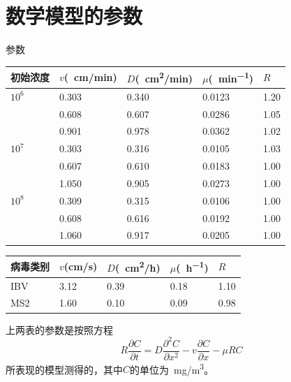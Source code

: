 \documentclass[xcolor=dvipsnames]{beamer}
\begin{document}
\section{数学模型的参数}
	\begin{frame}{参数}
	\centering
	\begin{tabularx}{12cm}{XXXXX}
	\toprule
初始浓度 & $v$(\SI{}{cm/min}) & $D$(\SI{}{cm^2/min}) & $\mu$(\SI{}	{min^{-1}}) & $R$\\
	\midrule
$10^6$	&	0.303	&	0.340	&	0.0123	&	1.20 \\
		&	0.608	&	0.607	&	0.0286	&	1.05 \\
		&	0.901	&	0.978	&	0.0362	&	1.02 \\
$10^7$	&	0.303	&	0.316	&	0.0105	&	1.03 \\
		&	0.607	&	0.610	&	0.0183	&	1.00 \\
		&	1.050	&	0.905	&	0.0273	&	1.00 \\
$10^8$	&	0.309	&	0.315	&	0.0106	&	1.00 \\
		&	0.608	&	0.616	&	0.0192	&	1.00 \\
		&	1.060	&	0.917	&	0.0205	&	1.00 \\
	\bottomrule
	\end{tabularx}\end{frame}
	\begin{frame}
	\begin{center}
	\begin{tabularx}{12cm}{XXXXX}
\toprule
病毒类别 & $v$(cm/s) & $D$(\SI{}{cm^2/h}) & $\mu$(\SI{}{h^{-1}}) & $R$\\
\midrule
IBV		& 3.12	& 0.39	&	0.18	&	1.10	\\
MS2		& 1.60	& 0.10	&	0.09	&	0.98	\\
\bottomrule
\end{tabularx}
	\end{center}\par
	上两表的参数是按照方程
\begin{equation}\label{equ:canshuf}
	R\dfrac{\partial C}{\partial t} = D\dfrac{\partial^2 C}{\partial x^2}-v\dfrac{\partial C}{\partial x}-\mu RC
\end{equation}
所表现的模型测得的，其中$C$的单位为\SI{}{mg/m^3}。
	\end{frame}
\end{document}
